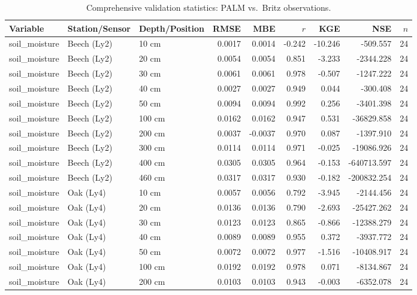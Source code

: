 \begin{table}[htbp]
\centering
\caption{Comprehensive validation statistics: PALM vs.\ Britz observations.}
\label{tab:britz_statistics}
\small
\begin{tabular}{lllrrrrrr}
\toprule
Variable & Station/Sensor & Depth/Position & RMSE & MBE & $r$ & KGE & NSE & $n$ \\
\midrule
soil\_moisture & Beech (Ly2) & 10 cm & 0.0017 & 0.0014 & -0.242 & -10.246 & -509.557 & 24 \\
soil\_moisture & Beech (Ly2) & 20 cm & 0.0054 & 0.0054 & 0.851 & -3.233 & -2344.228 & 24 \\
soil\_moisture & Beech (Ly2) & 30 cm & 0.0061 & 0.0061 & 0.978 & -0.507 & -1247.222 & 24 \\
soil\_moisture & Beech (Ly2) & 40 cm & 0.0027 & 0.0027 & 0.949 & 0.044 & -300.408 & 24 \\
soil\_moisture & Beech (Ly2) & 50 cm & 0.0094 & 0.0094 & 0.992 & 0.256 & -3401.398 & 24 \\
soil\_moisture & Beech (Ly2) & 100 cm & 0.0162 & 0.0162 & 0.947 & 0.531 & -36829.858 & 24 \\
soil\_moisture & Beech (Ly2) & 200 cm & 0.0037 & -0.0037 & 0.970 & 0.087 & -1397.910 & 24 \\
soil\_moisture & Beech (Ly2) & 300 cm & 0.0114 & 0.0114 & 0.971 & -0.025 & -19086.926 & 24 \\
soil\_moisture & Beech (Ly2) & 400 cm & 0.0305 & 0.0305 & 0.964 & -0.153 & -640713.597 & 24 \\
soil\_moisture & Beech (Ly2) & 460 cm & 0.0317 & 0.0317 & 0.930 & -0.182 & -200832.254 & 24 \\
soil\_moisture & Oak (Ly4) & 10 cm & 0.0057 & 0.0056 & 0.792 & -3.945 & -2144.456 & 24 \\
soil\_moisture & Oak (Ly4) & 20 cm & 0.0136 & 0.0136 & 0.790 & -2.693 & -25427.262 & 24 \\
soil\_moisture & Oak (Ly4) & 30 cm & 0.0123 & 0.0123 & 0.865 & -0.866 & -12388.279 & 24 \\
soil\_moisture & Oak (Ly4) & 40 cm & 0.0089 & 0.0089 & 0.955 & 0.372 & -3937.772 & 24 \\
soil\_moisture & Oak (Ly4) & 50 cm & 0.0072 & 0.0072 & 0.977 & -1.516 & -10408.917 & 24 \\
soil\_moisture & Oak (Ly4) & 100 cm & 0.0192 & 0.0192 & 0.978 & 0.071 & -8134.867 & 24 \\
soil\_moisture & Oak (Ly4) & 200 cm & 0.0103 & 0.0103 & 0.943 & -0.003 & -6352.078 & 24 \\

\end{tabular}
\end{table}
